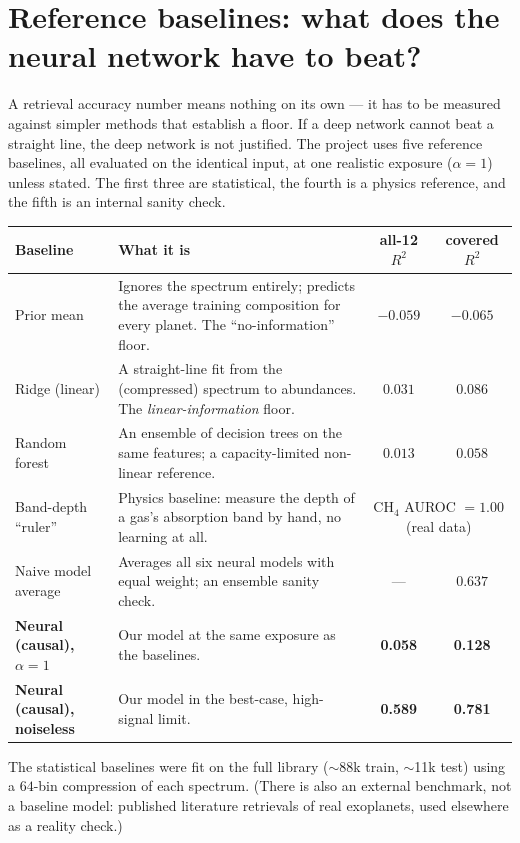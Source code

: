 \documentclass[11pt]{article}
\newcommand{\rsq}{$R^2$}
\begin{document}
\section{Reference baselines: what does the neural network have to beat?}

A retrieval accuracy number means nothing on its own --- it has to be measured against
simpler methods that establish a floor. If a deep network cannot beat a straight line, the
deep network is not justified. The project uses five reference baselines, all evaluated on the
identical input, at one realistic exposure ($\alpha = 1$) unless stated. The first three are
statistical, the fourth is a physics reference, and the fifth is an internal sanity check.

\begin{center}
\begin{tabular}{p{3.2cm}p{6.2cm}cc}
\toprule
Baseline & What it is & all-12 \rsq{} & covered \rsq{} \\
\midrule
Prior mean & Ignores the spectrum entirely; predicts the average training composition for every
planet. The ``no-information'' floor. & $-0.059$ & $-0.065$ \\[2pt]
Ridge (linear) & A straight-line fit from the (compressed) spectrum to abundances. The
\emph{linear-information} floor. & $0.031$ & $0.086$ \\[2pt]
Random forest & An ensemble of decision trees on the same features; a capacity-limited
non-linear reference. & $0.013$ & $0.058$ \\[2pt]
Band-depth ``ruler'' & Physics baseline: measure the depth of a gas's absorption band by hand,
no learning at all. & \multicolumn{2}{c}{CH$_4$ AUROC $=1.00$ (real data)} \\[2pt]
Naive model average & Averages all six neural models with equal weight; an ensemble sanity
check. & --- & $0.637$ \\
\midrule
\textbf{Neural (causal), $\alpha=1$} & Our model at the same exposure as the baselines.
& \textbf{0.058} & \textbf{0.128} \\
\textbf{Neural (causal), noiseless} & Our model in the best-case, high-signal limit.
& \textbf{0.589} & \textbf{0.781} \\
\bottomrule
\end{tabular}
\end{center}

\noindent The statistical baselines were fit on the full library ($\sim$88k train, $\sim$11k
test) using a $64$-bin compression of each spectrum. (There is also an external benchmark, not
a baseline model: published literature retrievals of real exoplanets, used elsewhere as a
reality check.)
\end{document}
